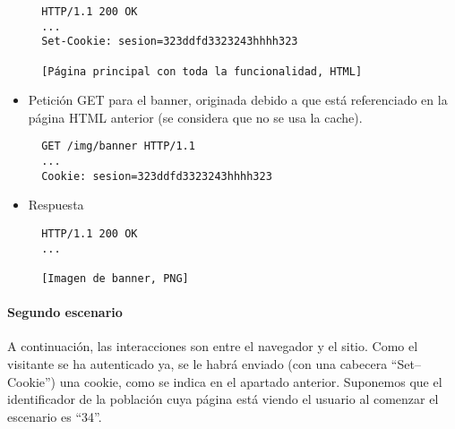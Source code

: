 \begin{itemize}
\begin{verbatim}
  HTTP/1.1 200 OK
  ...
  Set-Cookie: sesion=323ddfd3323243hhhh323

  [Página principal con toda la funcionalidad, HTML]
\end{verbatim}

\item Petición GET para el banner, originada debido a que está referenciado
  en la página HTML anterior (se considera que no se usa la cache).

\begin{verbatim}
  GET /img/banner HTTP/1.1
  ...
  Cookie: sesion=323ddfd3323243hhhh323
\end{verbatim}

\item Respuesta

\begin{verbatim}
  HTTP/1.1 200 OK
  ...

  [Imagen de banner, PNG]
\end{verbatim}
  

\end{itemize}


\paragraph{Segundo escenario}

A continuación, las interacciones son entre el navegador y el sitio. Como el visitante se ha autenticado ya, se le habrá enviado (con una cabecera ``Set--Cookie'') una cookie, como se indica en el apartado anterior. Suponemos que el identificador de la población cuya página está viendo el usuario al comenzar el escenario es ``34''.


